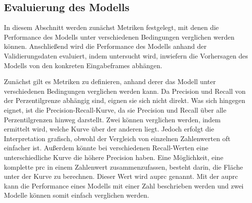 \subsection{Evaluierung des Modells}
\label{sec:Evaluierung}
In diesem Abschnitt werden zunächst Metriken festgelegt, mit denen die Performance des Modells unter verschiedenen Bedingungen verglichen werden können.
Anschließend wird die Performance des Modells anhand der Validierungsdaten evaluiert, indem untersucht wird, inwiefern die Vorhersagen des Modells von den konkreten Eingabeframes abhängen.

Zunächst gilt es Metriken zu definieren, anhand derer das Modell unter verschiedenen Bedingungen verglichen werden kann.
Da Precision und Recall von der Perzentilgrenze abhängig sind, eignen sie sich nicht direkt.
Was sich hingegen eignet, ist die Precision-Recall-Kurve, da sie Precision und Recall über alle Perzentilgrenzen hinweg darstellt.
Zwei  können verglichen werden, indem ermittelt wird, welche Kurve über der anderen liegt.
Jedoch erfolgt die Interpretation grafisch, obwohl der Vergleich von einzelnen Zahlenwerten oft einfacher ist.
Außerdem könnte bei verschiedenen Recall-Werten eine unterschiedliche Kurve die höhere Precision haben.
Eine Möglichkeit, eine komplette \acrshort{prc} in einem Zahlenwert zusammenzufassen, besteht darin, die Fläche unter der Kurve zu berechnen.
Dieser Wert wird \acrfull{auprc} genannt.
Mit der \acrshort{auprc} kann die Performance eines Modells mit einer Zahl beschrieben werden und zwei Modelle können somit einfach verglichen werden.

